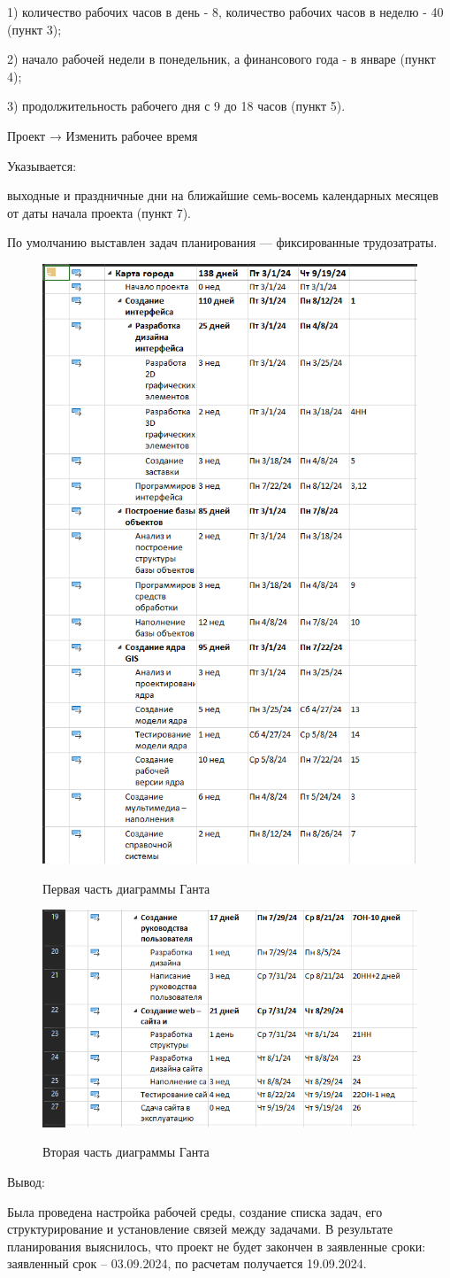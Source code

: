 1) количество рабочих часов в день - 8, количество рабочих часов в неделю - 40 (пункт 3);

2) начало рабочей недели в понедельник, а финансового года - в январе (пункт 4);

3) продолжительность рабочего дня с 9 до 18 часов (пункт 5).	

Проект → Изменить рабочее время

Указывается:

выходные и праздничные дни на ближайшие семь-восемь календарных месяцев от даты начала проекта (пункт 7).

По умолчанию выставлен задач планирования --- фиксированные трудозатраты.


\begin{figure}[ht!]
	\includegraphics[width=0.75\linewidth]{assets/images/image_2024-02-27_11-22-13.png}
	\label{fig:r2}
	\caption{Первая часть диаграммы Ганта}
\end{figure}
\FloatBarrier
\begin{figure}[ht!]
	\includegraphics[width=0.75\linewidth]{assets/images/image_2024-02-27_11-23-54.png}
	\label{fig:r2}
	\caption{Вторая часть диаграммы Ганта}
\end{figure}
\FloatBarrier
Вывод:

Была проведена настройка рабочей среды, создание списка задач, его структурирование и установление связей между задачами.
В результате планирования выяснилось, что проект не будет закончен в заявленные сроки: заявленный срок – 03.09.2024, по расчетам получается 19.09.2024.
